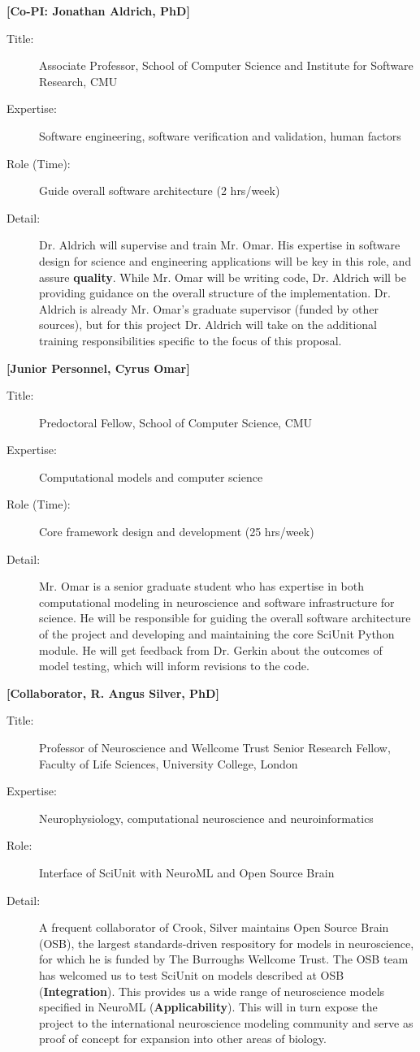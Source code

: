 \documentclass[a4paper,12pt]{article}
\begin{document}
\textbf{[Co-PI: Jonathan Aldrich, PhD]}
\begin{description}
\item[Title:] Associate Professor, School of Computer Science and Institute for Software Research, CMU
\item[Expertise:] Software engineering, software verification and validation, human factors
\item[Role (Time):] Guide overall software architecture (2 hrs/week)
\item[Detail:] Dr. Aldrich will supervise and train Mr. Omar.  His expertise in software design for science and engineering applications will be key in this role, and assure \textbf{quality}.  While Mr. Omar will be writing code, Dr. Aldrich will be providing guidance on the overall structure of the implementation.  Dr. Aldrich is already Mr. Omar's graduate supervisor (funded by other sources), but for this project Dr. Aldrich will take on the additional training responsibilities specific to the focus of this proposal.  
\end{description}
\textbf{[Junior Personnel, Cyrus Omar]}
\begin{description}
\item[Title:] Predoctoral Fellow, School of Computer Science, CMU
\item[Expertise:] Computational models and computer science 
\item[Role (Time):] Core framework design and development (25 hrs/week)
\item[Detail:] Mr. Omar is a senior graduate student who has expertise in both computational modeling in neuroscience and software infrastructure for science.  He will be responsible for guiding the overall software architecture of the project and developing and maintaining the core SciUnit Python module.  He will get feedback from Dr. Gerkin about the outcomes of model testing, which will inform revisions to the code.  
\end{description}
\textbf{[Collaborator, R. Angus Silver, PhD]}
\begin{description}
\item[Title:] Professor of Neuroscience and Wellcome Trust Senior Research Fellow, Faculty of Life Sciences, University College, London
\item[Expertise:] Neurophysiology, computational neuroscience and neuroinformatics  
\item[Role:] Interface of SciUnit with NeuroML and Open Source Brain
\item[Detail:] A frequent collaborator of Crook, Silver maintains Open Source Brain (OSB), the largest standards-driven respository for models in neuroscience, for which he is funded by The Burroughs Wellcome Trust.  The OSB team has welcomed us to test SciUnit on models described at OSB (\textbf{Integration}).  This provides us a wide range of neuroscience models specified in NeuroML (\textbf{Applicability}).  This will in turn expose the project to the international neuroscience modeling community and serve as proof of concept for expansion into other areas of biology.  
\end{description}
\end{document}
